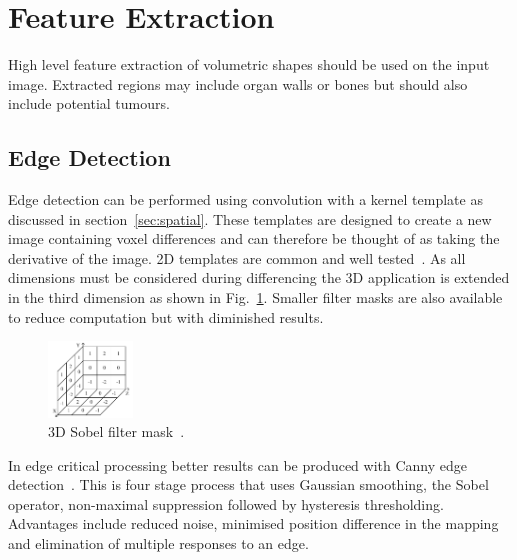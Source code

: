 \documentclass[journal]{IEEEtran}
\begin{document}
\section{Feature Extraction}
\label{sec:extraction}

High level feature extraction of volumetric shapes should be used on the input image.
Extracted regions may include organ walls or bones but should also include potential tumours.


\subsection{Edge Detection}
\label{sec:edge}
Edge detection can be performed using convolution with a kernel template as discussed in section~\ref{sec:spatial}. 
These templates are designed to create a new image containing voxel differences and can therefore be thought of as taking the derivative of the image.
2D templates are common and well tested~\cite{nixon02feature}.
As all dimensions must be considered during differencing the 3D application is extended in the third dimension as shown in Fig.~\ref{fig:sobel}.
Smaller filter masks are also available to reduce computation but with diminished results.

\begin{figure}[!htb]
   \centering
   \includegraphics[width = 0.2\textwidth]{Figures/Sobel.pdf}
   \caption{3D Sobel filter mask~\cite{lohmann1998volumetric}.}
   \label{fig:sobel}
\end{figure}

In edge critical processing better results can be produced with Canny edge detection~\cite{canny86edge}. 
This is four stage process that uses Gaussian smoothing, the Sobel operator, non-maximal suppression followed by hysteresis thresholding.
Advantages include reduced noise, minimised position difference in the mapping and elimination of multiple responses to an edge.
\end{document}
